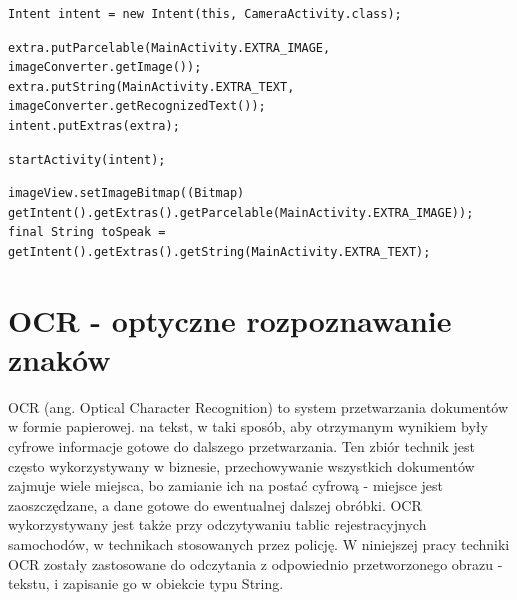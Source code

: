 \documentclass[eng,oneside]{mgr}
\begin{document}
\begin{lstlisting}[caption={Zadeklarowanie intencji.}]
Intent intent = new Intent(this, CameraActivity.class);
\end{lstlisting}
\begin{lstlisting}[caption={Przekazanie obiektów różnego typu w intencji.}]
extra.putParcelable(MainActivity.EXTRA_IMAGE, imageConverter.getImage());
extra.putString(MainActivity.EXTRA_TEXT, imageConverter.getRecognizedText());
intent.putExtras(extra);
\end{lstlisting}
\begin{lstlisting}[caption={Wywołanie intencji.}]
startActivity(intent);
\end{lstlisting}
\begin{lstlisting}[caption={Obsługa intencji w klasie w którym ma zostać wykonana.}]
imageView.setImageBitmap((Bitmap) getIntent().getExtras().getParcelable(MainActivity.EXTRA_IMAGE));
final String toSpeak = getIntent().getExtras().getString(MainActivity.EXTRA_TEXT);
\end{lstlisting}
\section{OCR - optyczne rozpoznawanie znaków}
OCR (ang. Optical Character Recognition) to system przetwarzania dokumentów w formie papierowej. na tekst, w taki sposób, aby otrzymanym wynikiem były cyfrowe informacje gotowe do dalszego przetwarzania. Ten zbiór technik jest często wykorzystywany w biznesie, przechowywanie wszystkich dokumentów zajmuje wiele miejsca, bo zamianie ich na postać cyfrową - miejsce jest zaoszczędzane, a dane gotowe do ewentualnej dalszej obróbki\cite{dokument}. OCR wykorzystywany jest także przy odczytywaniu tablic rejestracyjnych samochodów, w technikach stosowanych przez policję. \cite{car} W niniejszej pracy techniki OCR zostały zastosowane do odczytania z odpowiednio przetworzonego obrazu - tekstu, i zapisanie go w obiekcie typu String.
\end{document}
